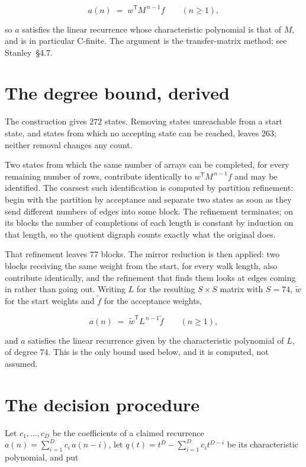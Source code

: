 \documentclass[11pt]{article}
\theoremstyle{definition}
\begin{document}
\[a(n) \;=\; w^{\mathsf T} M^{\,n-1} f \qquad (n \ge 1),\]

so $a$ satisfies the linear recurrence whose characteristic polynomial is that of $M$, and is in particular C-finite. The argument is the transfer-matrix method; see Stanley~\S4.7.

\section{The degree bound, derived}

The construction gives $272$ states. Removing states unreachable from a start state, and states from which no accepting state can be reached, leaves $263$; neither removal changes any count.

Two states from which the same number of arrays can be completed, for every remaining number of rows, contribute identically to $w^{\mathsf T}M^{\,n-1}f$ and may be identified. The coarsest such identification is computed by partition refinement: begin with the partition by acceptance and separate two states as soon as they send different numbers of edges into some block. The refinement terminates; on its blocks the number of completions of each length is constant by induction on that length, so the quotient digraph counts exactly what the original does.

That refinement leaves $77$ blocks. The mirror reduction is then applied: two blocks receiving the same weight from the start, for every walk length, also contribute identically, and the refinement that finds them looks at edges coming in rather than going out. Writing $L$ for the resulting $S \times S$ matrix with $S = 74$, $\tilde w$ for the start weights and $\tilde f$ for the acceptance weights,

\[a(n) \;=\; \tilde w^{\mathsf T} L^{\,n-1} \tilde f \qquad (n \ge 1),\]

and $a$ satisfies the linear recurrence given by the characteristic polynomial of $L$, of degree $74$. This is the only bound used below, and it is computed, not assumed.

\section{The decision procedure}

Let $c_1,\dots,c_D$ be the coefficients of a claimed recurrence $a(n) = \sum_{i=1}^{D} c_i\,a(n-i)$, let $q(t) = t^{D} - \sum_{i=1}^{D} c_i t^{D-i}$ be its characteristic polynomial, and put
\end{document}
